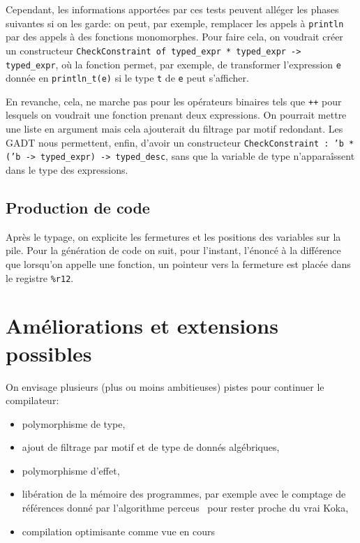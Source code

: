 \documentclass[11pt]{article}
\begin{document}
Cependant, les informations apportées par ces tests peuvent alléger les phases
suivantes si on les garde: on peut, par exemple, remplacer les appels à
\texttt{println} par des appels à des fonctions monomorphes. Pour faire cela, on
voudrait créer un constructeur \texttt{CheckConstraint of typed\_expr *
  typed\_expr -> typed\_expr}, où la fonction permet, par exemple, de
transformer l'expression \texttt{e} donnée en \texttt{println\_t(e)} si le type
\texttt{t} de \texttt{e} peut s'afficher.

En revanche, cela, ne marche pas pour les opérateurs binaires tels que
\texttt{++} pour lesquels on voudrait une fonction prenant deux expressions. On
pourrait mettre une liste en argument mais cela ajouterait du filtrage par motif
redondant. Les GADT nous permettent, enfin, d'avoir un constructeur
\texttt{\texttt{CheckConstraint : 'b * ('b -> typed\_expr) -> typed\_desc}},
sans que la variable de type n'apparaîssent dans le type des expressions.

\subsection{Production de code}
Après le typage, on explicite les fermetures et les positions des variables sur
la pile. Pour la génération de code on suit, pour l'instant, l'énoncé à la
différence que lorsqu'on appelle une fonction, un pointeur vers la fermeture est
placée dans le registre \texttt{\%r12}.

\section{Améliorations et extensions possibles}
On envisage plusieurs (plus ou moins ambitieuses) pistes pour continuer le
compilateur:
\begin{itemize}
  \item polymorphisme de type,
  \item ajout de filtrage par motif et de type de donnés algébriques,
  \item polymorphisme d'effet,
  \item libération de la mémoire des programmes, par exemple avec le comptage de
    références donné par l'algorithme perceus~\cite{reinking2021perceus} pour
    rester proche du vrai Koka,
  \item compilation optimisante comme vue en cours
\end{itemize}
\printbibliography
\end{document}
